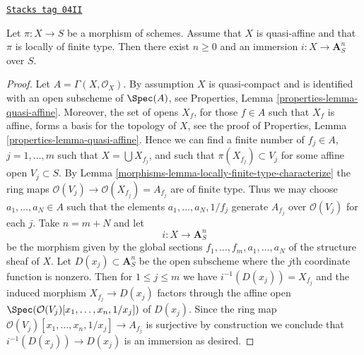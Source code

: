 \begin{lemma}
\label{morphisms-lemma-quasi-affine-finite-type-over-S}
\href{https://stacks.math.columbia.edu/tag/04II}{\texttt{Stacks tag 04II}}

Let $\pi : X \to S$ be a morphism of schemes.
Assume that $X$ is quasi-affine and that $\pi$ is locally of finite type.
Then there exist $n \geq 0$ and an immersion $i : X \to \mathbf{A}^n_S$
over $S$.
\end{lemma}

\begin{proof}

Let $A = \Gamma(X, \mathcal{O}_X)$. By assumption $X$ is quasi-compact
and is identified with an open subscheme of $\Spec(A)$, see
Properties, Lemma \ref{properties-lemma-quasi-affine}.
Moreover, the set of opens $X_f$, for those $f \in A$ such that $X_f$ is
affine, forms a basis for the topology of $X$, see the proof of
Properties, Lemma \ref{properties-lemma-quasi-affine}.
Hence we can find a finite number of $f_j \in A$, $j = 1, \ldots, m$ such that
$X = \bigcup X_{f_j}$, and such that $\pi(X_{f_j}) \subset V_j$ for
some affine open $V_j \subset S$. By
Lemma \ref{morphisms-lemma-locally-finite-type-characterize}
the ring maps $\mathcal{O}(V_j) \to \mathcal{O}(X_{f_j}) = A_{f_j}$
are of finite type. Thus we may choose $a_1, \ldots, a_N \in A$ such that
the elements $a_1, \ldots, a_N, 1/f_j$ generate
$A_{f_j}$ over $\mathcal{O}(V_j)$ for each $j$. Take $n = m + N$ and
let
$$
i : X \longrightarrow \mathbf{A}^n_S
$$
be the morphism given by the global sections
$f_1, \ldots, f_m, a_1, \ldots, a_N$ of the structure sheaf of $X$.
Let $D(x_j) \subset \mathbf{A}^n_S$ be the open subscheme where the
$j$th coordinate function is nonzero.
Then for $1 \leq j \leq m$ we have $i^{-1}(D(x_j)) = X_{f_j}$ and
the induced morphism $X_{f_j} \to D(x_j)$ factors through the affine
open $\Spec(\mathcal{O}(V_j)[x_1, \ldots, x_n, 1/x_j])$
of $D(x_j)$. Since the ring map
$\mathcal{O}(V_j)[x_1, \ldots, x_n, 1/x_j] \to A_{f_j}$ is
surjective by construction we conclude that $i^{-1}(D(x_j)) \to D(x_j)$
is an immersion as desired.
\end{proof}

